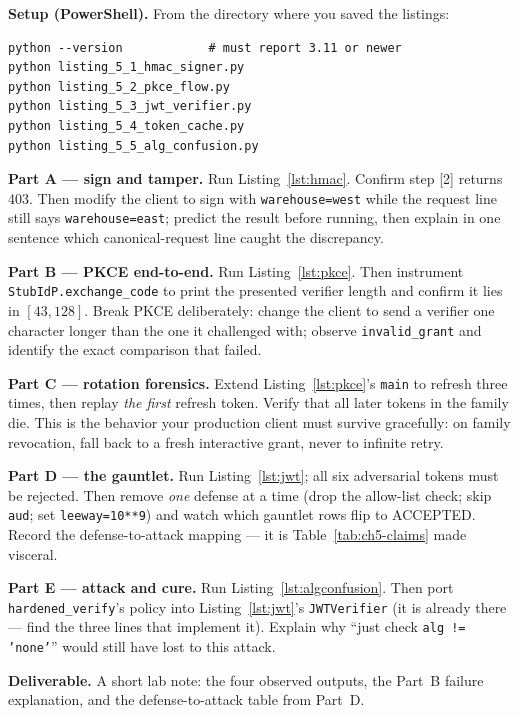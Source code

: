 \textbf{Setup (PowerShell).} From the directory where you saved the
listings:

\begin{verbatim}
python --version            # must report 3.11 or newer
python listing_5_1_hmac_signer.py
python listing_5_2_pkce_flow.py
python listing_5_3_jwt_verifier.py
python listing_5_4_token_cache.py
python listing_5_5_alg_confusion.py
\end{verbatim}

\textbf{Part A --- sign and tamper.} Run Listing~\ref{lst:hmac}. Confirm
step [2] returns 403. Then modify the client to sign with
\texttt{warehouse=west} while the request line still says
\texttt{warehouse=east}; predict the result before running, then explain in
one sentence which canonical-request line caught the discrepancy.

\textbf{Part B --- PKCE end-to-end.} Run Listing~\ref{lst:pkce}. Then
instrument \texttt{StubIdP.exchange\_code} to print the presented verifier
length and confirm it lies in $[43, 128]$. Break PKCE deliberately: change
the client to send a verifier one character longer than the one it
challenged with; observe \texttt{invalid\_grant} and identify the exact
comparison that failed.

\textbf{Part C --- rotation forensics.} Extend Listing~\ref{lst:pkce}'s
\texttt{main} to refresh three times, then replay \emph{the first} refresh
token. Verify that all later tokens in the family die. This is the behavior
your production client must survive gracefully: on family revocation, fall
back to a fresh interactive grant, never to infinite retry.

\textbf{Part D --- the gauntlet.} Run Listing~\ref{lst:jwt}; all six
adversarial tokens must be rejected. Then remove \emph{one} defense at a
time (drop the allow-list check; skip \texttt{aud}; set
\texttt{leeway=10**9}) and watch which gauntlet rows flip to ACCEPTED.
Record the defense-to-attack mapping --- it is Table~\ref{tab:ch5-claims}
made visceral.

\textbf{Part E --- attack and cure.} Run Listing~\ref{lst:algconfusion}.
Then port \texttt{hardened\_verify}'s policy into Listing~\ref{lst:jwt}'s
\texttt{JWTVerifier} (it is already there --- find the three lines that
implement it). Explain why ``just check \texttt{alg != 'none'}'' would still
have lost to this attack.

\textbf{Deliverable.} A short lab note: the four observed outputs, the
Part~B failure explanation, and the defense-to-attack table from Part~D.


